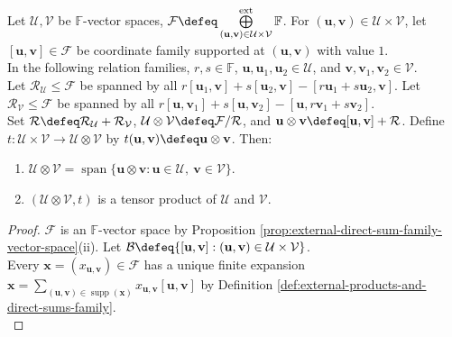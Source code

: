 \begin{theorem} \label{thm:tensor-product-quotient-construction} \\
Let $\mathcal{U},\mathcal{V}$ be $\mathbb{F}$-vector spaces, $\mathcal{F}\defeq\bigoplus\limits_{(\mathbf{u},\mathbf{v})\in\mathcal{U}\times\mathcal{V}}^{\mathrm{ext}}\mathbb{F}$. For $(\mathbf{u},\mathbf{v})\in\mathcal{U}\times\mathcal{V}$, let $[\mathbf{u},\mathbf{v}]\in\mathcal{F}$ be coordinate family supported at $(\mathbf{u},\mathbf{v})$ with value $1$.\\
In the following relation families, $r,s\in\mathbb{F}$, $\mathbf{u},\mathbf{u}_1,\mathbf{u}_2\in\mathcal{U}$, and $\mathbf{v},\mathbf{v}_1,\mathbf{v}_2\in\mathcal{V}$.\\
Let $\mathcal{R}_{\mathcal{U}}\leq\mathcal{F}$ be spanned by all $r[\mathbf{u}_1,\mathbf{v}]+s[\mathbf{u}_2,\mathbf{v}]-[r\mathbf{u}_1+s\mathbf{u}_2,\mathbf{v}]$. Let $\mathcal{R}_{\mathcal{V}}\leq\mathcal{F}$ be spanned by all $r[\mathbf{u},\mathbf{v}_1]+s[\mathbf{u},\mathbf{v}_2]-[\mathbf{u},r\mathbf{v}_1+s\mathbf{v}_2]$.\\
Set $\mathcal{R}\defeq\mathcal{R}_{\mathcal{U}}+\mathcal{R}_{\mathcal{V}}$, $\mathcal{U}\otimes\mathcal{V}\defeq\mathcal{F}/\mathcal{R}$, and $\mathbf{u}\otimes\mathbf{v}\defeq[\mathbf{u},\mathbf{v}]+\mathcal{R}$. Define $t:\mathcal{U}\times\mathcal{V}\to\mathcal{U}\otimes\mathcal{V}$ by $t(\mathbf{u},\mathbf{v})\defeq\mathbf{u}\otimes\mathbf{v}$. Then:
\begin{enumerate}[label=(\roman*)]
\setlength{\itemsep}{0pt}
\item $\mathcal{U}\otimes\mathcal{V}=\operatorname{span}\{\mathbf{u}\otimes\mathbf{v}:\mathbf{u}\in\mathcal{U},\ \mathbf{v}\in\mathcal{V}\}$.
\item $(\mathcal{U}\otimes\mathcal{V},t)$ is a tensor product of $\mathcal{U}$ and $\mathcal{V}$.
\end{enumerate}
\begin{proof}
$\mathcal{F}$ is an $\mathbb{F}$-vector space by Proposition \ref{prop:external-direct-sum-family-vector-space}(ii). Let $\mathcal{B}\defeq\{[\mathbf{u},\mathbf{v}]:(\mathbf{u},\mathbf{v})\in\mathcal{U}\times\mathcal{V}\}$.\\
Every $\mathbf{x}=(x_{\mathbf{u},\mathbf{v}})\in\mathcal{F}$ has a unique finite expansion $\mathbf{x}=\sum\limits_{(\mathbf{u},\mathbf{v})\in\operatorname{supp}(\mathbf{x})}x_{\mathbf{u},\mathbf{v}}[\mathbf{u},\mathbf{v}]$ by Definition \ref{def:external-products-and-direct-sums-family}.\\

\end{proof}
\end{theorem}
